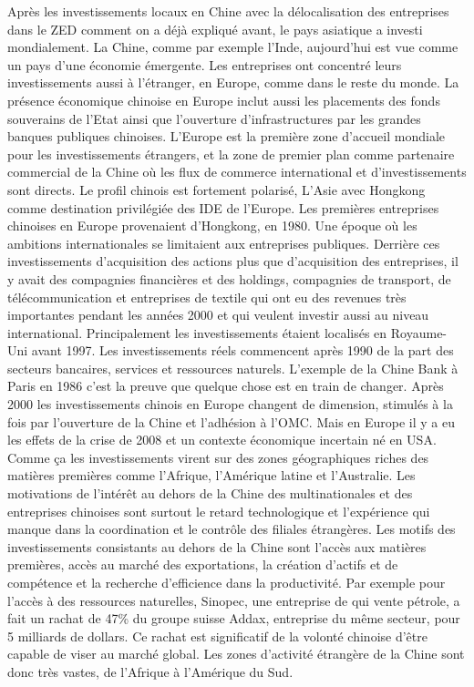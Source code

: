 Après les investissements locaux en Chine avec la délocalisation des entreprises dans le ZED comment on a déjà expliqué avant, le pays asiatique a investi mondialement.
La Chine, comme par exemple l’Inde, aujourd’hui est vue comme un pays d’une économie émergente. Les entreprises ont concentré leurs investissements aussi à l’étranger, en Europe, comme dans le reste du monde. La présence économique chinoise en Europe inclut aussi les placements des fonds souverains de l’Etat ainsi que l’ouverture d’infrastructures par les grandes banques publiques chinoises.  
L’Europe est la première zone d’accueil mondiale pour les investissements étrangers, et la zone de premier plan comme partenaire commercial de la Chine où les flux de commerce international et d’investissements sont directs.
Le profil chinois est fortement polarisé, L’Asie avec Hongkong comme destination privilégiée des IDE de l’Europe. Les premières entreprises chinoises en Europe provenaient d’Hongkong, en 1980. Une époque où les ambitions internationales se limitaient aux entreprises publiques. Derrière ces investissements d’acquisition des actions plus que d’acquisition des entreprises, il y avait des compagnies financières et des holdings, compagnies de transport, de télécommunication et entreprises de textile qui ont eu des revenues très importantes pendant les années 2000 et qui veulent investir aussi au niveau international. Principalement les investissements étaient localisés en Royaume-Uni avant 1997. 
Les investissements réels commencent après 1990 de la part des secteurs bancaires, services et ressources naturels. L’exemple de la Chine Bank à Paris en 1986 c’est la preuve que quelque chose est en train de changer. 
Après 2000 les investissements chinois en Europe changent de dimension, stimulés à la fois par l’ouverture de la Chine et l’adhésion à l’OMC. Mais en Europe il y a eu les effets de la crise de 2008 et un contexte économique incertain né en USA. Comme ça les investissements virent sur des zones géographiques riches des matières premières comme l’Afrique, l’Amérique latine et l’Australie. 
Les motivations de l’intérêt au dehors de la Chine des multinationales et des entreprises chinoises sont surtout le retard technologique et l’expérience qui manque dans la coordination et le contrôle des filiales étrangères. 
Les motifs des investissements consistants au dehors de la Chine sont l’accès aux matières premières, accès au marché des exportations, la création d’actifs et de compétence et la recherche d’efficience dans la productivité. 
Par exemple pour l’accès à des ressources naturelles, Sinopec, une entreprise de qui vente pétrole, a fait un rachat de 47\% du groupe suisse Addax, entreprise du même secteur, pour 5 milliards de dollars. Ce rachat est significatif de la volonté chinoise d’être capable de viser au marché global. Les zones d’activité étrangère de la Chine sont donc très vastes, de l’Afrique à l’Amérique du Sud.  
